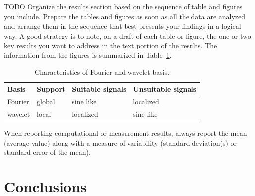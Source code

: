\documentclass[10pt,conference,compsocconf]{IEEEtran}
\begin{document}
TODO
Organize the results section based on the sequence of table and
figures you include. Prepare the tables and figures as soon as all
the data are analyzed and arrange them in the sequence that best
presents your findings in a logical way. A good strategy is to note,
on a draft of each table or figure, the one or two key results you
want to address in the text portion of the results.
The information from the figures is
summarized in Table~\ref{tab:fourier-wavelet}.

\begin{table}[htbp]
  \centering
  \begin{tabular}[c]{|l||l|l|l|}
    \hline
    Basis&Support&Suitable signals&Unsuitable signals\\
    \hline
    Fourier&global&sine like&localized\\
    wavelet&local&localized&sine like\\
    \hline
  \end{tabular}
  \caption{Characteristics of Fourier and wavelet basis.}
  \label{tab:fourier-wavelet}
\end{table}

When reporting computational or measurement results, always
report the mean (average value) along with a measure of variability
(standard deviation(s) or standard error of the mean).







\section{Conclusions}
\label{sec:conclusions}






\end{document}
